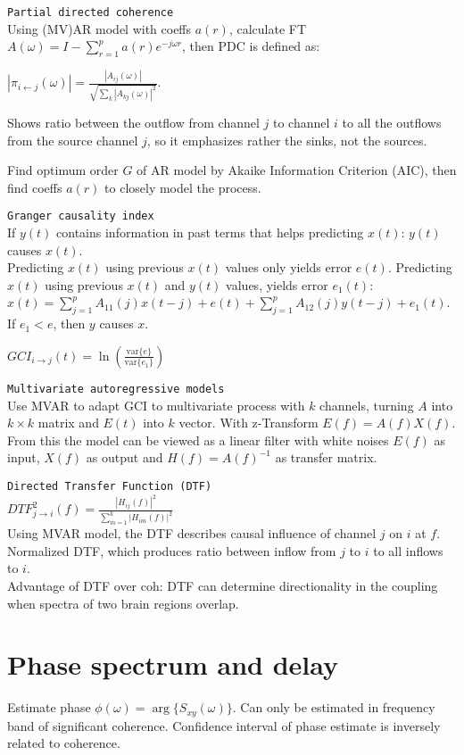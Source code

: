 \verb!Partial directed coherence!\\
Using (MV)AR model with coeffs $a(r)$, calculate FT $A(\omega) = I-\sum_{r=1}^p a(r) e^{-j\omega r}$, then PDC is defined as:\vs

$|\pi_{i\leftarrow j}(\omega)| = \frac{|A_{ij}(\omega)|}{\sqrt{\sum_k |A_{kj}(\omega)|^2}}$. \vs

Shows ratio between the outflow from channel $j$ to channel $i$ to all the outflows from the source channel $j$, so it emphasizes rather the sinks, not the sources. 

Find optimum order $G$ of AR model by Akaike Information Criterion (AIC), then find coeffs $a(r)$ to closely model the process.\vs

\verb!Granger causality index!\\
If $y(t)$ contains information in past terms that helps predicting $x(t)$: $y(t)$ causes $x(t)$. \\
Predicting $x(t)$ using previous $x(t)$ values only yields error $e(t)$. Predicting $x(t)$ using previous $x(t)$ and $y(t)$ values, yields error $e_1(t)$:\\
$x(t) = \sum_{j=1}^p A_{11}(j)x(t-j) + e(t) + \sum_{j=1}^p A_{12}(j)y(t-j)+e_1(t)$.\\
If $e_1 < e$, then $y$ causes $x$.\vs

$GCI_{i\rightarrow j}(t) = \ln\left(\frac{\text{var}\{e\}}{\text{var}\{e_1\}}\right)$

\verb!Multivariate autoregressive models!\\
Use MVAR to adapt GCI to multivariate process with $k$ channels, turning $A$ into $k\times k$ matrix and $E(t)$ into $k$ vector. With z-Transform $E(f)=A(f)X(f)$. From this the model can be viewed as a linear filter with white noises $E(f)$ as input, $X(f)$ as output and $H(f)=A(f)^{-1}$ as transfer matrix.\vs

\verb!Directed Transfer Function (DTF)!\\
$DTF^2_{j\rightarrow i}(f) = \frac{|H_{ij}(f)|^2}{\sum_{m=1}^k|H_{im}(f)|^2}$\\
Using MVAR model, the DTF describes causal influence of channel $j$ on $i$ at $f$. Normalized DTF, which produces ratio between inflow from $j$ to $i$ to all inflows to $i$.\\
Advantage of DTF over coh: DTF can determine directionality in the coupling when spectra of two brain regions overlap.

\section{Phase spectrum and delay}
Estimate phase $\phi(\omega) = \arg \{S_{xy}(\omega)\}$. Can only be estimated in frequency band of significant coherence. Confidence interval of phase estimate is inversely related to coherence.

